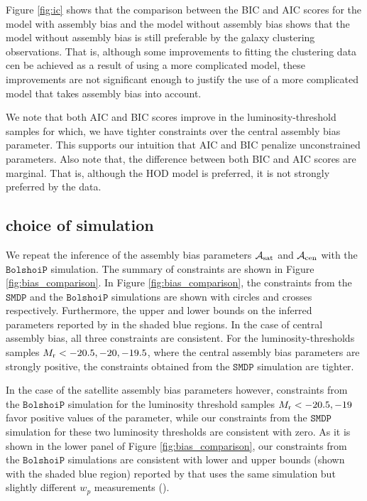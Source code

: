Figure \ref{fig:ic} shows that the comparison between the BIC and AIC scores for the model with assembly bias and the model without assembly bias shows that the model without assembly bias is still preferable by the galaxy clustering observations. That is, although some improvements to fitting the clustering data cen be achieved as a result of using a more complicated model, these improvements are not significant enough to justify the use of a more complicated model that takes assembly bias into account. 

We note that both AIC and BIC scores improve in the luminosity-threshold samples for which, we have tighter constraints over the central assembly bias parameter. This supports our intuition that AIC and BIC penalize unconstrained parameters. Also note that, the difference between both BIC and AIC scores are marginal. That is, although the HOD model is preferred, it is not strongly preferred by the data.

\subsection{choice of simulation}

  We repeat the inference of the assembly bias parameters $\mathcal{A}_{\rm sat}$ and $\mathcal{A}_{\rm cen}$ with the $\mathtt{BolshoiP}$ simulation. The summary of constraints are shown in Figure \ref{fig:bias_comparison}. In Figure \ref{fig:bias_comparison}, the constraints from the $\mathtt{SMDP}$ and the $\mathtt{BolshoiP}$ simulations are shown with circles and crosses respectively. Furthermore, the upper and lower bounds on the inferred parameters reported by \citealt{zentner2016} in the shaded blue regions. In the case of central assembly bias, all three constraints are consistent. For the luminosity-thresholds samples $M_{\rm r}<-20.5, -20, -19.5$, where the central assembly bias parameters are strongly positive, the constraints obtained from the $\mathtt{SMDP}$ simulation are tighter. 
  
In the case of the satellite assembly bias parameters however, constraints from the $\mathtt{BolshoiP}$ simulation for the luminosity threshold samples $M_{\rm r}<-20.5, -19$ favor positive values of the parameter, while our constraints from the $\mathtt{SMDP}$ simulation for these two luminosity thresholds are consistent with zero. As it is shown in the lower panel of Figure \ref{fig:bias_comparison}, our constraints from the $\mathtt{BolshoiP}$ simulations are consistent with lower and upper bounds (shown with the shaded blue region) reported by \citealt{zentner2016} that uses the same simulation but slightly different $w_{p}$ measurements (\citealt{zehavi2011}). 

